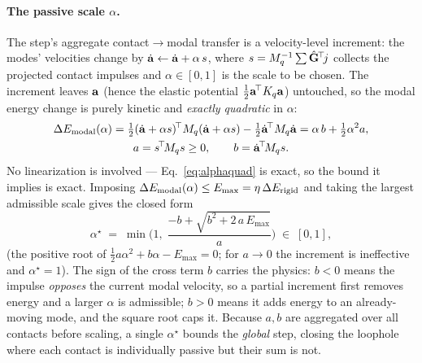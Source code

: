 \paragraph*{The passive scale $\alpha$.}
The step's aggregate contact$\to$modal transfer is a velocity-level increment: the
modes' velocities change by $\dot{\mathbf{a}} \leftarrow \dot{\mathbf{a}} + \alpha\,s$, where
$s = M_q^{-1}\sum\hat{\mathbf{G}}^{\!\top}\!j$ collects the projected contact impulses and
$\alpha\in[0,1]$ is the scale to be chosen. The increment leaves $\mathbf{a}$ (hence the
elastic potential $\tfrac12\mathbf{a}^{\!\top}K_q\mathbf{a}$) untouched, so the modal energy
change is purely kinetic and \emph{exactly quadratic} in $\alpha$:
\begin{equation}
\begin{gathered}
  \Delta E_{\mathrm{modal}}(\alpha)
  = \tfrac12(\dot{\mathbf{a}}+\alpha s)^{\!\top} M_q(\dot{\mathbf{a}}+\alpha s)
    - \tfrac12\dot{\mathbf{a}}^{\!\top} M_q\dot{\mathbf{a}}
  = \alpha\, b + \tfrac12\alpha^2 a,\\
  a = s^{\!\top}\! M_q s \ge 0,\qquad
  b = \dot{\mathbf{a}}^{\!\top}\! M_q s .
\end{gathered}
  \label{eq:alphaquad}
\end{equation}
No linearization is involved --- Eq.~\ref{eq:alphaquad} is exact, so the bound it
implies is exact. Imposing $\Delta E_{\mathrm{modal}}(\alpha)\le E_{\max}=\eta\,\Delta E_{\mathrm{rigid}}$ and taking
the largest admissible scale gives the closed form
\begin{equation}
  \alpha^\star \;=\;
  \min\!\Big(1,\; \frac{-b+\sqrt{b^2+2\,a\,E_{\max}}}{a}\Big) \;\in\; [0,1],
  \label{eq:alphastar}
\end{equation}
(the positive root of $\tfrac12 a\alpha^2+b\alpha-E_{\max}=0$; for $a\to0$ the
increment is ineffective and $\alpha^\star=1$). The sign of the cross term $b$ carries
the physics: $b<0$ means the impulse \emph{opposes} the current modal velocity,
so a partial increment first removes energy and a larger $\alpha$ is admissible;
$b>0$ means it adds energy to an already-moving mode, and the square root caps it. Because
$a,b$ are aggregated over all contacts before scaling, a single $\alpha^\star$
bounds the \emph{global} step, closing the
loophole where each contact is individually passive but their sum is not.

